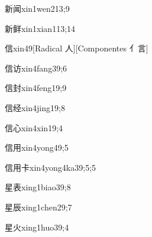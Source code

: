 \begin{verbete}{新闻}{xin1wen2}{13;9}
\end{verbete}

\begin{verbete}{新鲜}{xin1xian1}{13;14}
\end{verbete}

\begin{verbete}{信}{xin4}{9}[Radical 人][Componentes 亻言]
\end{verbete}

\begin{verbete}{信访}{xin4fang3}{9;6}
\end{verbete}

\begin{verbete}{信封}{xin4feng1}{9;9}
\end{verbete}

\begin{verbete}{信经}{xin4jing1}{9;8}
\end{verbete}

\begin{verbete}{信心}{xin4xin1}{9;4}
\end{verbete}

\begin{verbete}{信用}{xin4yong4}{9;5}
\end{verbete}

\begin{verbete}{信用卡}{xin4yong4ka3}{9;5;5}
\end{verbete}

\begin{verbete}{星表}{xing1biao3}{9;8}
\end{verbete}

\begin{verbete}{星辰}{xing1chen2}{9;7}
\end{verbete}

\begin{verbete}{星火}{xing1huo3}{9;4}
\end{verbete}

